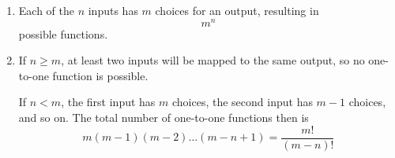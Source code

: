 \begin{enumerate}[label=(\alph*)]
\item Each of the $n$ inputs has $m$ choices for an output, resulting in 
$$m^{n}$$ possible functions.

\item If $n \geq m$, at least two inputs will be mapped to the same output, 
so no one-to-one function is possible. 
  
  If $n < m$, the first input has $m$ choices, the second input has $m - 1$ 
  choices, and so on. The total number of one-to-one functions then is 
  $$m(m-1)(m-2)\dots(m-n+1) = \frac{m!}{(m-n)!} $$
\end{enumerate}
